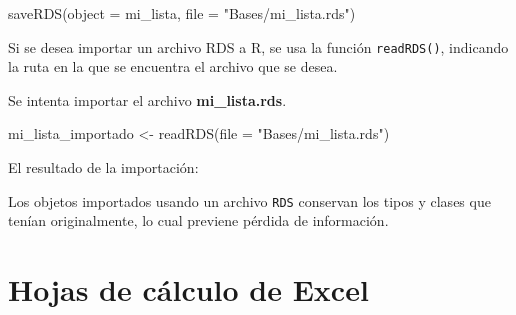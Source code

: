 \documentclass[
]{book}
\newenvironment{Shaded}{\begin{snugshade}}{\end{snugshade}}
\newcommand{\AttributeTok}[1]{\textcolor[rgb]{0.77,0.63,0.00}{#1}}
\newcommand{\CommentTok}[1]{\textcolor[rgb]{0.56,0.35,0.01}{\textit{#1}}}
\newcommand{\DocumentationTok}[1]{\textcolor[rgb]{0.56,0.35,0.01}{\textbf{\textit{#1}}}}
\newcommand{\FunctionTok}[1]{\textcolor[rgb]{0.00,0.00,0.00}{#1}}
\newcommand{\NormalTok}[1]{#1}
\newcommand{\OtherTok}[1]{\textcolor[rgb]{0.56,0.35,0.01}{#1}}
\newcommand{\StringTok}[1]{\textcolor[rgb]{0.31,0.60,0.02}{#1}}
\begin{document}
\begin{Shaded}
\begin{Highlighting}[]
\FunctionTok{saveRDS}\NormalTok{(}\AttributeTok{object =}\NormalTok{ mi\_lista, }\AttributeTok{file =} \StringTok{"Bases/mi\_lista.rds"}\NormalTok{)}
\end{Highlighting}
\end{Shaded}

Si se desea importar un archivo RDS a R, se usa la función \texttt{readRDS()}, indicando la ruta en la que se encuentra el archivo que se desea.

Se intenta importar el archivo \textbf{mi\_lista.rds}.

\begin{Shaded}
\begin{Highlighting}[]
\NormalTok{mi\_lista\_importado }\OtherTok{\textless{}{-}} \FunctionTok{readRDS}\NormalTok{(}\AttributeTok{file =} \StringTok{"Bases/mi\_lista.rds"}\NormalTok{)}
\end{Highlighting}
\end{Shaded}

El resultado de la importación:

\begin{Shaded}
\end{Shaded}

Los objetos importados usando un archivo \texttt{RDS} conservan los tipos y clases que tenían originalmente, lo cual previene pérdida de información.

\hypertarget{hojas-de-cuxe1lculo-de-excel}{%
\section{Hojas de cálculo de Excel}\label{hojas-de-cuxe1lculo-de-excel}}
\end{document}
